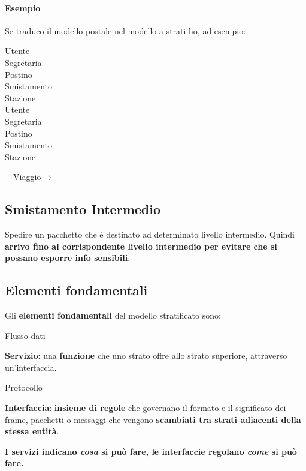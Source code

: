 \documentclass[10pt]{article}
\begin{document}
\paragraph{Esempio} Se traduco il modello postale nel modello a strati ho, ad esempio:\\
\begin{center}
\begin{multicols}{2}
Utente\\Segretaria\\Postino\\Smistamento\\Stazione\\
\columnbreak
Utente\\Segretaria\\Postino\\Smistamento\\Stazione\\
\end{multicols}
---Viaggio$\rightarrow$
\end{center}

\subsection{Smistamento Intermedio} Spedire un pacchetto che è destinato ad determinato livello intermedio. Quindi \textbf{arrivo fino al corrispondente livello intermedio per evitare che si possano esporre info sensibili}.
\subsection{Elementi fondamentali}
Gli \textbf{elementi fondamentali} del modello stratificato sono:
\begin{list}{}{}
\item Flusso dati
\item \textbf{Servizio}: una \textbf{funzione} che uno strato offre allo strato superiore, attraverso un'interfaccia.
\item Protocollo
\item \textbf{Interfaccia}: \textbf{insieme di regole} che governano il formato e il significato dei frame, pacchetti o messaggi che vengono \textbf{scambiati tra strati adiacenti della stessa entità}.
\end{list}
\textbf{I servizi indicano \textit{cosa} si può fare, le interfaccie regolano \textit{come} si può fare.}
\end{document}

